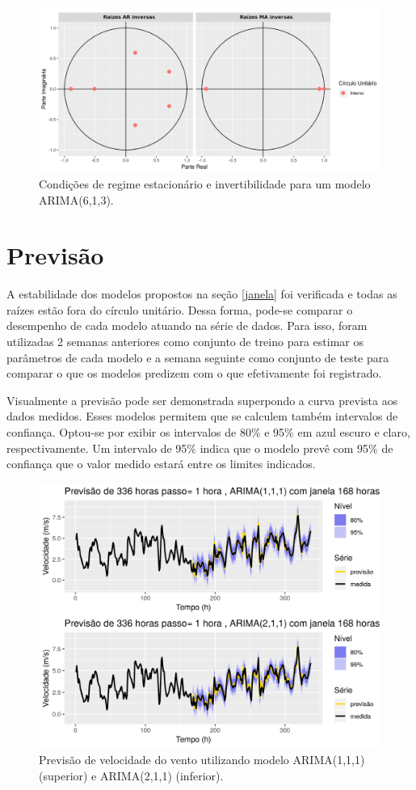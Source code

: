\documentclass[
	12pt,				%
	openright,			%
	oneside,			%
	a4paper,			%
	english,			%
	french,				%
	spanish,			%
	brazil				%
	]{abntex2}
\begin{document}
\begin{figure}[h]
    \centering
	\includegraphics[width=\textwidth]{conds}
	\caption{Condições de regime estacionário e invertibilidade para um modelo ARIMA(6,1,3).}
\end{figure}
\FloatBarrier

\section{Previsão}

A estabilidade dos modelos propostos na seção \ref{janela} foi verificada e todas as raízes estão fora do círculo unitário. Dessa forma, pode-se comparar o desempenho de cada modelo atuando na série de dados. Para isso, foram utilizadas 2 semanas anteriores como conjunto de treino para estimar os parâmetros de cada modelo e a semana seguinte como conjunto de teste para comparar o que os modelos predizem com o que efetivamente foi registrado.

Visualmente a previsão pode ser demonstrada superpondo a curva prevista aos dados medidos. Esses modelos permitem que se calculem também intervalos de confiança. Optou-se por exibir os intervalos de 80\% e 95\% em azul escuro e claro, respectivamente. Um intervalo de 95\% indica que o modelo prevê com 95\% de confiança que o valor medido estará entre os limites indicados.

\begin{figure}[h]
    \centering
	\includegraphics[width=\textwidth]{arima12}
	\caption{Previsão de velocidade do vento utilizando modelo ARIMA(1,1,1) (superior) e ARIMA(2,1,1) (inferior).}
\end{figure}
\FloatBarrier
\end{document}
